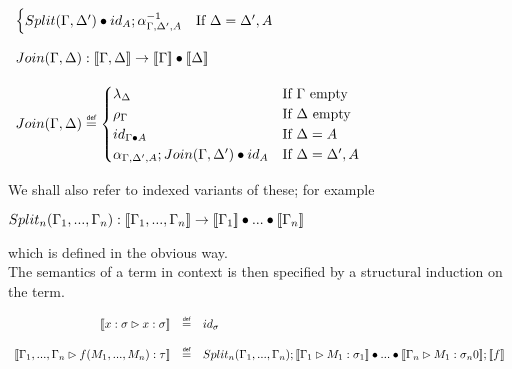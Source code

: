 \begin{definition}
\begin{center}
\begin{math}
\begin{array}{l}
\begin{cases}
                    Split(\Gamma,\Delta')\bullet id_{A};\alpha^{-1}_{\Gamma,\Delta',A} & \text{If } \Delta = \Delta',A
                \end{cases}
                \\\\
                Join(\Gamma,\Delta): \interp{\Gamma,\Delta} \rightarrow \interp{\Gamma} \bullet \interp{\Delta}\\\\
                Join(\Gamma,\Delta) \myeq 
                \begin{cases}
                    \lambda_\Delta & \text{If } \Gamma \text{ empty}\\
                    \rho_\Gamma & \text{If } \Delta \text{ empty}\\
                    id_{\Gamma \bullet A} & \text{If }\Delta = A\\
                    \alpha_{\Gamma,\Delta',A};Join(\Gamma,\Delta')\bullet id_A & \text{If } \Delta = \Delta', A
                \end{cases}
            \end{array}
        \end{math}
    \end{center}
    We shall also refer to indexed variants of these; for example
    \begin{center}
        \begin{math}
            Split_n(\Gamma_1 ,...,\Gamma_n):[\negthinspace[\Gamma_1 ,...,\Gamma_n]\negthinspace] \rightarrow [\negthinspace[\Gamma_1]\negthinspace] \bullet ... \bullet [\negthinspace[\Gamma_n]\negthinspace]
        \end{math}
    \end{center}
    which is defined in the obvious way.\\
    \indent The semantics of a term in context is then specified by a structural induction on the term.
    \begin{center}
        \begin{math}
            \begin{array}{rcl}
                \interp{x:\sigma \rhd x:\sigma} & \myeq & id_\sigma\\\\
                \interp{\Gamma_1,...,\Gamma_n \rhd f(M_1,...,M_n):\tau} & \myeq & Split_n(\Gamma_1,...,\Gamma_n);\interp{\Gamma_1 \rhd M_1:\sigma_1}
                \bullet ... \bullet \interp{\Gamma_n \rhd M_1:\sigma_n0};\interp{f}
            \end{array}
        \end{math}
    \end{center}
\end{definition}